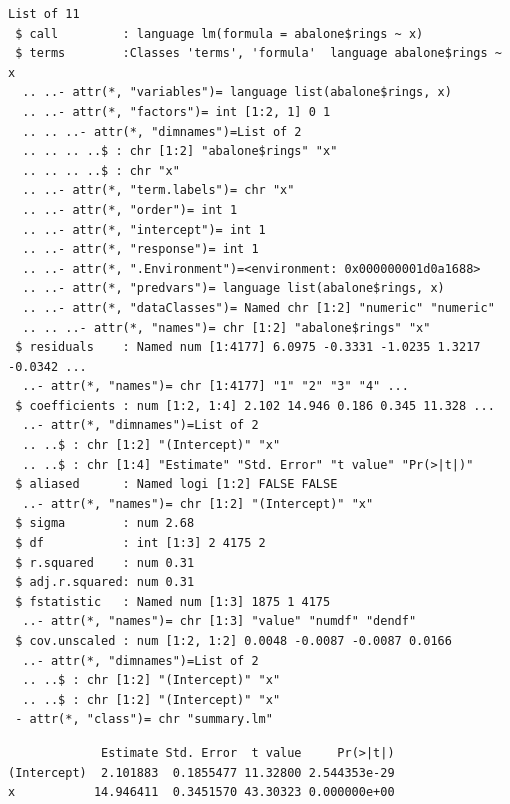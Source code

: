 \documentclass[
  11pt,
]{krantz}
\newenvironment{Shaded}{\begin{snugshade}}{\end{snugshade}}
\newcommand{\CommentTok}[1]{\textcolor[rgb]{0.37,0.37,0.37}{\textit{#1}}}
\newcommand{\ControlFlowTok}[1]{\textcolor[rgb]{0.27,0.27,0.27}{\textbf{#1}}}
\newcommand{\DecValTok}[1]{\textcolor[rgb]{0.06,0.06,0.06}{#1}}
\newcommand{\KeywordTok}[1]{\textcolor[rgb]{0.27,0.27,0.27}{\textbf{#1}}}
\newcommand{\NormalTok}[1]{#1}
\newcommand{\OperatorTok}[1]{\textcolor[rgb]{0.43,0.43,0.43}{\textbf{#1}}}
\newcommand{\StringTok}[1]{\textcolor[rgb]{0.5,0.5,0.5}{#1}}
\begin{document}
\begin{verbatim}
List of 11
 $ call         : language lm(formula = abalone$rings ~ x)
 $ terms        :Classes 'terms', 'formula'  language abalone$rings ~ x
  .. ..- attr(*, "variables")= language list(abalone$rings, x)
  .. ..- attr(*, "factors")= int [1:2, 1] 0 1
  .. .. ..- attr(*, "dimnames")=List of 2
  .. .. .. ..$ : chr [1:2] "abalone$rings" "x"
  .. .. .. ..$ : chr "x"
  .. ..- attr(*, "term.labels")= chr "x"
  .. ..- attr(*, "order")= int 1
  .. ..- attr(*, "intercept")= int 1
  .. ..- attr(*, "response")= int 1
  .. ..- attr(*, ".Environment")=<environment: 0x000000001d0a1688> 
  .. ..- attr(*, "predvars")= language list(abalone$rings, x)
  .. ..- attr(*, "dataClasses")= Named chr [1:2] "numeric" "numeric"
  .. .. ..- attr(*, "names")= chr [1:2] "abalone$rings" "x"
 $ residuals    : Named num [1:4177] 6.0975 -0.3331 -1.0235 1.3217 -0.0342 ...
  ..- attr(*, "names")= chr [1:4177] "1" "2" "3" "4" ...
 $ coefficients : num [1:2, 1:4] 2.102 14.946 0.186 0.345 11.328 ...
  ..- attr(*, "dimnames")=List of 2
  .. ..$ : chr [1:2] "(Intercept)" "x"
  .. ..$ : chr [1:4] "Estimate" "Std. Error" "t value" "Pr(>|t|)"
 $ aliased      : Named logi [1:2] FALSE FALSE
  ..- attr(*, "names")= chr [1:2] "(Intercept)" "x"
 $ sigma        : num 2.68
 $ df           : int [1:3] 2 4175 2
 $ r.squared    : num 0.31
 $ adj.r.squared: num 0.31
 $ fstatistic   : Named num [1:3] 1875 1 4175
  ..- attr(*, "names")= chr [1:3] "value" "numdf" "dendf"
 $ cov.unscaled : num [1:2, 1:2] 0.0048 -0.0087 -0.0087 0.0166
  ..- attr(*, "dimnames")=List of 2
  .. ..$ : chr [1:2] "(Intercept)" "x"
  .. ..$ : chr [1:2] "(Intercept)" "x"
 - attr(*, "class")= chr "summary.lm"
\end{verbatim}

\begin{Shaded}
\end{Shaded}

\begin{verbatim}
             Estimate Std. Error  t value     Pr(>|t|)
(Intercept)  2.101883  0.1855477 11.32800 2.544353e-29
x           14.946411  0.3451570 43.30323 0.000000e+00
\end{verbatim}

\begin{Shaded}
\end{Shaded}
\end{document}
